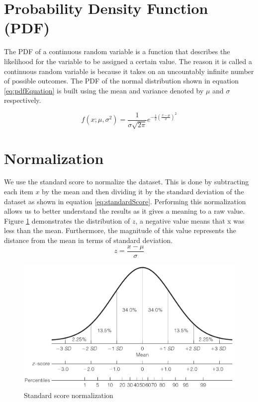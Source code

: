 \documentclass{mproj}
\begin{document}
\section{Probability Density Function (PDF)}
\label{sec:pdf}
The PDF \cite{kolmogorov1960foundations} of a continuous random variable is a function that describes the likelihood for the variable to be assigned a certain value. The reason it is called a continuous random variable is because it takes on an uncountably infinite number of possible outcomes. The PDF of the normal distribution shown in equation \ref{eq:pdfEquation} is built using the mean and variance denoted by $\mu$ and $\sigma$ respectively.

\begin{equation}
\label{eq:pdfEquation}
f(x;\mu,\sigma^2) = \frac{1}{\sigma\sqrt{2\pi}}e^{-\frac{1}{2}(\frac{x-\mu}{\sigma})^2}
\end{equation}

\section{Normalization}
We use the standard score \cite{normalization} to normalize the dataset. This is done by subtracting each item $x$ by the mean and then dividing it by the standard deviation of the dataset as shown in equation \ref{eq:standardScore}. Performing this normalization allows us to better understand the results as it gives a meaning to a raw value. Figure \ref{fig:zscore} demonstrates the distribution of $z$, a negative value means that x was less than the mean. Furthermore, the magnitude of this value represents the distance from the mean in terms of standard deviation.
\begin{equation}
\label{eq:standardScore}
z= \frac{x - \mu}{\sigma}
\end{equation}
\begin{figure}[H]
\caption{Standard score normalization \cite{normalization}}
\label{fig:zscore}
\centerline{\includegraphics[scale=0.4]{zscore}}
\end{figure}
\end{document}
